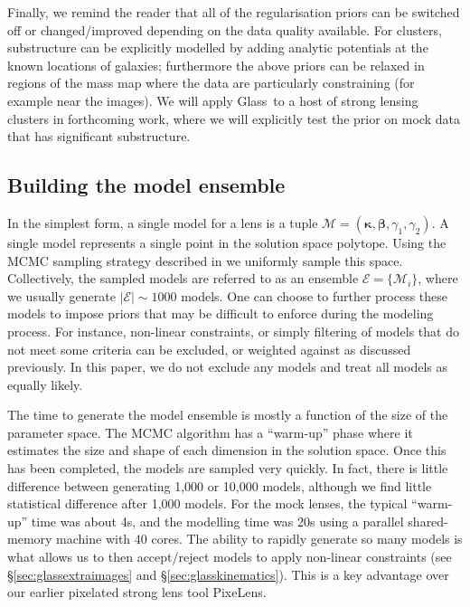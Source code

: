 \documentclass[galley,usenatbib]{mn2e}
\renewcommand{\vec}[1]{\ensuremath{\boldsymbol{#1}}}
\newcommand{\Glass}{{\sc Glass}}
\newcommand{\PixeLens}{{\sc PixeLens}}
\newcommand{\M}{\ensuremath{\mathscr{M}}}
\newcommand{\E}{\ensuremath{\mathscr{E}}}
\newcommand{\secref}[1] {\S\ref{#1}}
\begin{document}
Finally, we remind the reader that all of the regularisation priors can be
switched off or changed/improved depending on the data quality available. For
clusters, substructure can be explicitly modelled by adding analytic potentials
at the known locations of galaxies; furthermore the above priors can be relaxed
in regions of the mass map where the data are particularly constraining (for
example near the images). We will apply \Glass\ to a host of strong lensing
clusters in forthcoming work, where we will explicitly test the prior on mock
data that has significant substructure.

\subsection{Building the model ensemble} 

In the simplest form, a single model for a lens is a tuple $\M = (\vec\kappa,
\vec\beta, \gamma_1, \gamma_2)$. A single model represents a single point in
the solution space polytope. Using the MCMC sampling strategy described in
\cite{2012MNRAS.425.3077L} we uniformly sample this space. Collectively, the
sampled models are referred to as an ensemble $\E = \{\M_i\}$, where we usually
generate $|\E| \sim 1000$ models. One can choose to further process these
models to impose priors that may be difficult to enforce during the modeling
process. For instance, non-linear constraints, or simply filtering of models
that do not meet some criteria can be excluded, or weighted against as
discussed previously.  In this paper, we do not exclude any models and treat
all models as equally likely.

The time to generate the model ensemble is mostly a function of the size of the
parameter space. The MCMC algorithm has a ``warm-up'' phase where it estimates
the size and shape of each dimension in the solution space.  Once this has been
completed, the models are sampled very quickly. In fact, there is little
difference between generating 1,000 or 10,000 models, although we find little
statistical difference after 1,000 models. For the mock lenses, the typical
``warm-up'' time was about 4s, and the modelling time was 20s using a parallel
shared-memory machine with 40 cores. The ability to rapidly generate so many
models is what allows us to then accept/reject models to apply non-linear
constraints (see \secref{sec:glassextraimages} and
\secref{sec:glasskinematics}). This is a key advantage over our earlier
pixelated strong lens tool \PixeLens. 
\end{document}
